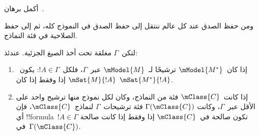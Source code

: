 \documentclass[../../../include/open-logic-section]{subfiles}
\begin{document}
\begin{prob}
  أكمل برهان~.
\end{prob}

ومن حفظ الصدق عند كل عالم ننتقل إلى حفظ الصدق في النموذج كله،
ثم إلى حفظ الصلاحية في فئة النماذج.

\begin{cor}
  لتكن~$\Gamma$ مغلقة تحت أخذ الصيغ الجزئية. عندئذ:
  \begin{enumerate}
  \item إذا كان~$\mModel{M^*}$ ترشيحًا لـ~$\mModel{M}$ عبر~$\Gamma$،
    فلكل~$!A \in \Gamma$: يكون~$\mSat{M}{!A}$ إذا وفقط إذا كان
    $\mSat{M^*}{!A}$.
  \item إذا كانت~$\mClass{C}$ فئة من النماذج، وكان لكل نموذج منها
    ترشيح واحد على الأقل عبر~$\Gamma$، وكانت
    $\Gamma(\mClass{C})$ فئة ترشيحات~$\Gamma$ لنماذج~$\mClass{C}$،
    فإن أي !!{formula}~$!A \in \Gamma$ تكون صالحة في~$\mClass{C}$ إذا
    وفقط إذا كانت صالحة في~$\Gamma(\mClass{C})$.
  \end{enumerate}
\end{cor}
\end{document}
